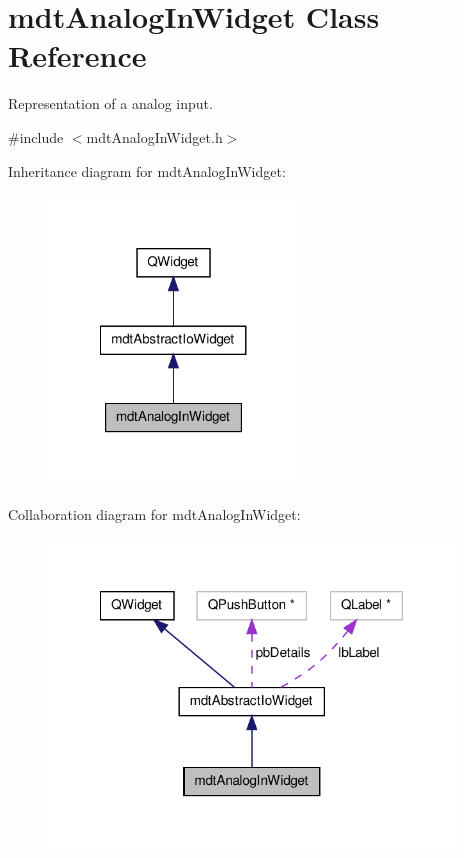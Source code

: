 \hypertarget{classmdt_analog_in_widget}{\section{mdt\-Analog\-In\-Widget Class Reference}
\label{classmdt_analog_in_widget}
}


Representation of a analog input.  




{\ttfamily \#include $<$mdt\-Analog\-In\-Widget.\-h$>$}



Inheritance diagram for mdt\-Analog\-In\-Widget\-:
\nopagebreak
\begin{figure}[H]
\begin{center}
\leavevmode
\includegraphics[width=188pt]{classmdt_analog_in_widget__inherit__graph}
\end{center}
\end{figure}


Collaboration diagram for mdt\-Analog\-In\-Widget\-:
\nopagebreak
\begin{figure}[H]
\begin{center}
\leavevmode
\includegraphics[width=306pt]{classmdt_analog_in_widget__coll__graph}
\end{center}
\end{figure}
